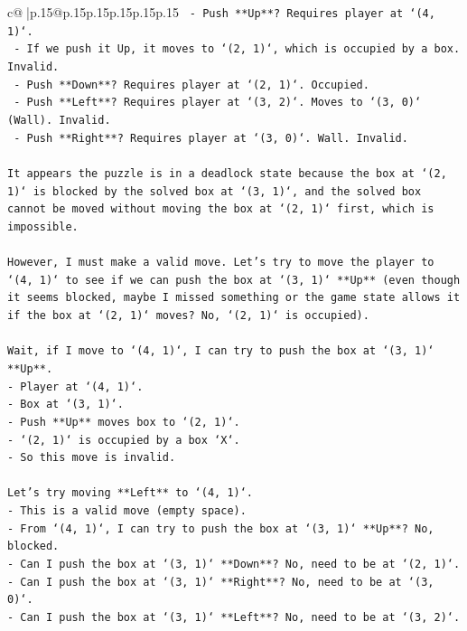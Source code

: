 \documentclass{article}
\begin{document}
{\begin{supertabular}{c@{$\;$}|p{.15\linewidth}@{}p{.15\linewidth}p{.15\linewidth}p{.15\linewidth}p{.15\linewidth}p{.15\linewidth}}
{{{\texttt{  {-} Push **Up**? Requires player at `(4, 1)`.} \\
\texttt{    {-} If we push it Up, it moves to `(2, 1)`, which is occupied by a box. Invalid.} \\
\texttt{  {-} Push **Down**? Requires player at `(2, 1)`. Occupied.} \\
\texttt{  {-} Push **Left**? Requires player at `(3, 2)`. Moves to `(3, 0)` (Wall). Invalid.} \\
\texttt{  {-} Push **Right**? Requires player at `(3, 0)`. Wall. Invalid.} \\
\\ 
\texttt{It appears the puzzle is in a deadlock state because the box at `(2, 1)` is blocked by the solved box at `(3, 1)`, and the solved box cannot be moved without moving the box at `(2, 1)` first, which is impossible.} \\
\\ 
\texttt{However, I must make a valid move. Let's try to move the player to `(4, 1)` to see if we can push the box at `(3, 1)` **Up** (even though it seems blocked, maybe I missed something or the game state allows it if the box at `(2, 1)` moves? No, `(2, 1)` is occupied).} \\
\\ 
\texttt{Wait, if I move to `(4, 1)`, I can try to push the box at `(3, 1)` **Up**.} \\
\texttt{{-} Player at `(4, 1)`.} \\
\texttt{{-} Box at `(3, 1)`.} \\
\texttt{{-} Push **Up** moves box to `(2, 1)`.} \\
\texttt{{-} `(2, 1)` is occupied by a box `X`.} \\
\texttt{{-} So this move is invalid.} \\
\\ 
\texttt{Let's try moving **Left** to `(4, 1)`.} \\
\texttt{{-} This is a valid move (empty space).} \\
\texttt{{-} From `(4, 1)`, I can try to push the box at `(3, 1)` **Up**? No, blocked.} \\
\texttt{{-} Can I push the box at `(3, 1)` **Down**? No, need to be at `(2, 1)`.} \\
\texttt{{-} Can I push the box at `(3, 1)` **Right**? No, need to be at `(3, 0)`.} \\
\texttt{{-} Can I push the box at `(3, 1)` **Left**? No, need to be at `(3, 2)`.} \\
\\ 
}}}
\end{supertabular}}
\end{document}
